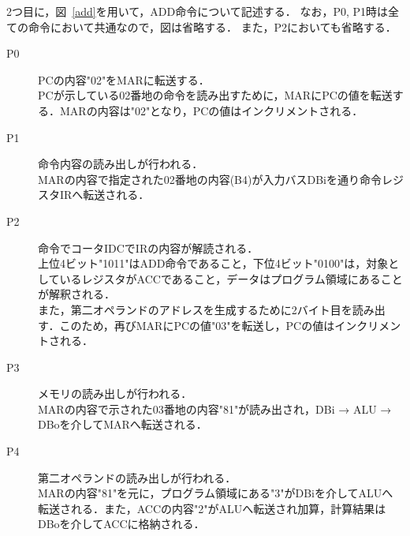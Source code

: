 \documentclass[dvipdfmx]{jsarticle}
\begin{document}
2つ目に，図~\ref{add}を用いて，ADD命令について記述する．
なお，P0, P1時は全ての命令において共通なので，図は省略する．
また，P2においても省略する．
\begin{description}
    \item[P0] PCの内容"02"をMARに転送する． \\ PCが示している02番地の命令を読み出すために，MARにPCの値を転送する．MARの内容は"02"となり，PCの値はインクリメントされる．
    \vspace{2mm}
    \item[P1] 命令内容の読み出しが行われる． \\ MARの内容で指定された02番地の内容(B4)が入力バスDBiを通り命令レジスタIRへ転送される．
    \vspace{2mm}
    \item[P2] 命令でコータIDCでIRの内容が解読される． \\ 上位4ビット"1011"はADD命令であること，下位4ビット"0100"は，対象としているレジスタがACCであること，データはプログラム領域にあることが解釈される． \\
    また，第二オペランドのアドレスを生成するために2バイト目を読み出す．このため，再びMARにPCの値"03"を転送し，PCの値はインクリメントされる．
    \vspace{2mm}
    \item[P3] メモリの読み出しが行われる． \\ MARの内容で示された03番地の内容"81"が読み出され，DBi → ALU → DBoを介してMARへ転送される．
    \vspace{2mm}
    \item[P4] 第二オペランドの読み出しが行われる． \\ MARの内容"81"を元に，プログラム領域にある"3"がDBiを介してALUへ転送される．また，ACCの内容"2"がALUへ転送され加算，計算結果はDBoを介してACCに格納される．
\end{description}
\end{document}
